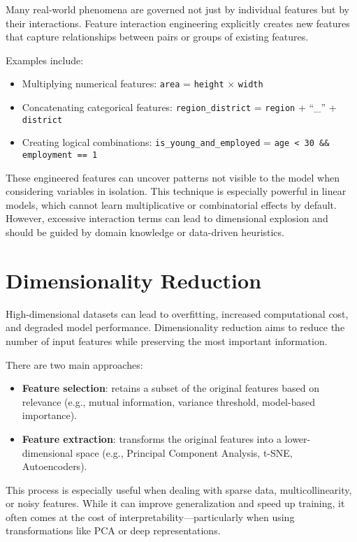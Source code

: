 \documentclass[12pt,openany]{book}
\begin{document}
Many real-world phenomena are governed not just by individual features but by their interactions. Feature interaction engineering explicitly creates new features that capture relationships between pairs or groups of existing features.

Examples include:
\begin{itemize}
    \item Multiplying numerical features: \texttt{area} = \texttt{height} $\times$ \texttt{width}
    \item Concatenating categorical features: \texttt{region\_district} = \texttt{region} + ``\_'' + \texttt{district}
    \item Creating logical combinations: \texttt{is\_young\_and\_employed} = \texttt{age < 30 \&\& employment == 1}
\end{itemize}

These engineered features can uncover patterns not visible to the model when considering variables in isolation. This technique is especially powerful in linear models, which cannot learn multiplicative or combinatorial effects by default. However, excessive interaction terms can lead to dimensional explosion and should be guided by domain knowledge or data-driven heuristics.


\section{Dimensionality Reduction}

High-dimensional datasets can lead to overfitting, increased computational cost, and degraded model performance. Dimensionality reduction aims to reduce the number of input features while preserving the most important information.

There are two main approaches:
\begin{itemize}
    \item \textbf{Feature selection}: retains a subset of the original features based on relevance (e.g., mutual information, variance threshold, model-based importance).
    \item \textbf{Feature extraction}: transforms the original features into a lower-dimensional space (e.g., Principal Component Analysis, t-SNE, Autoencoders).
\end{itemize}

This process is especially useful when dealing with sparse data, multicollinearity, or noisy features. While it can improve generalization and speed up training, it often comes at the cost of interpretability—particularly when using transformations like PCA or deep representations.
\end{document}
